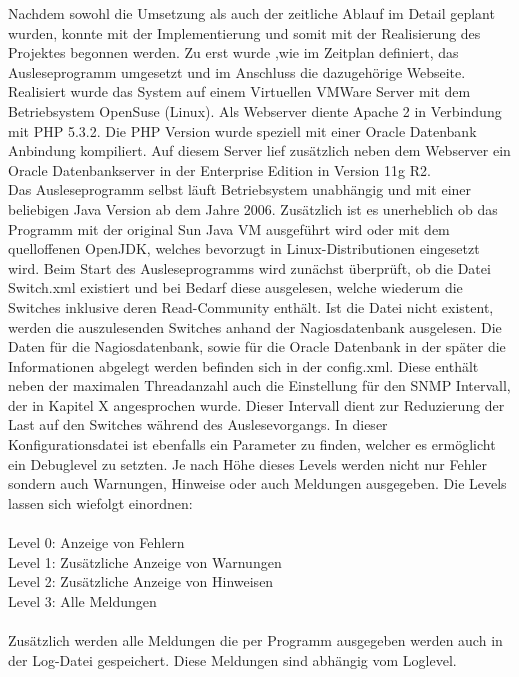Nachdem sowohl die Umsetzung als auch der zeitliche Ablauf im Detail geplant wurden, konnte mit der Implementierung und somit mit der Realisierung des Projektes begonnen werden.
Zu erst wurde ,wie im Zeitplan definiert, das Ausleseprogramm umgesetzt und im Anschluss die dazugehörige Webseite.\\
Realisiert wurde das System auf einem Virtuellen VMWare Server mit dem Betriebsystem OpenSuse (Linux). Als Webserver diente Apache 2 in Verbindung mit PHP 5.3.2. Die PHP Version wurde speziell mit einer Oracle Datenbank Anbindung kompiliert.
Auf diesem Server lief zusätzlich neben dem Webserver ein Oracle Datenbankserver in der Enterprise Edition in Version 11g R2.\\
Das Ausleseprogramm selbst läuft Betriebsystem unabhängig und mit einer beliebigen Java Version ab dem Jahre 2006. Zusätzlich ist es unerheblich ob das Programm mit der original Sun Java VM ausgeführt wird oder mit dem quelloffenen OpenJDK, welches bevorzugt in Linux-Distributionen eingesetzt wird.
Beim Start des Ausleseprogramms wird zunächst überprüft, ob die Datei Switch.xml existiert und bei Bedarf diese ausgelesen, welche wiederum die Switches inklusive deren Read-Community enthält. Ist die Datei nicht existent, werden die auszulesenden Switches anhand der Nagiosdatenbank ausgelesen. Die Daten für die Nagiosdatenbank, sowie für die Oracle Datenbank in der später die Informationen abgelegt werden befinden sich in der config.xml. Diese enthält neben der maximalen Threadanzahl auch die Einstellung für den SNMP Intervall, der in Kapitel X angesprochen wurde. Dieser Intervall dient zur Reduzierung der Last auf den Switches während des Auslesevorgangs. In dieser Konfigurationsdatei ist ebenfalls ein Parameter zu finden, welcher es ermöglicht ein Debuglevel zu setzten. Je nach Höhe dieses Levels werden nicht nur Fehler sondern auch Warnungen, Hinweise oder auch Meldungen ausgegeben. Die Levels lassen sich wiefolgt einordnen:\\
\\
Level 0: Anzeige von Fehlern\\
Level 1: Zusätzliche Anzeige von Warnungen\\
Level 2: Zusätzliche Anzeige von Hinweisen\\
Level 3: Alle Meldungen\\
\\
Zusätzlich werden alle Meldungen die per Programm ausgegeben werden auch in der Log-Datei gespeichert. Diese Meldungen sind abhängig vom Loglevel.
\\
